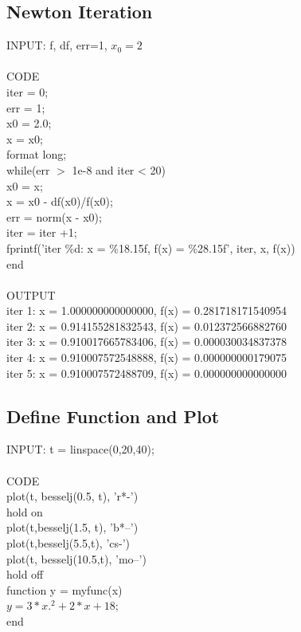 \documentclass[twoside,a4paper]{article}
\begin{document}
\subsection*{Newton Iteration}
\large INPUT: f, df, err=1, $x_0=2$ \\
\\
\large CODE \\
iter = 0;\\
err = 1;\\
x0 = 2.0;\\
x = x0;\\
format long;\\
while(err $>$ 1e-8 and iter < 20)\\
x0 = x;\\
x = x0 - df(x0)/f(x0);\\
err = norm(x - x0);\\
iter = iter +1;\\
fprintf('iter \%d: x = \%18.15f, f(x) = \%28.15f', iter, x, f(x))\\
end\\
\\
\large OUTPUT \\
iter 1: x =  1.000000000000000, f(x) =            0.281718171540954 \\
iter 2: x =  0.914155281832543, f(x) =            0.012372566882760 \\
iter 3: x =  0.910017665783406, f(x) =            0.000030034837378\\ 
iter 4: x =  0.910007572548888, f(x) =            0.000000000179075\\ 
iter 5: x =  0.910007572488709, f(x) =            0.000000000000000 \\

\subsection*{Define Function and Plot}
\large INPUT: t = linspace(0,20,40); \\
\\
\large CODE \\
plot(t, besselj(0.5, t), 'r*-')\\
hold on\\
plot(t,besselj(1.5, t), 'b*--')\\
plot(t,besselj(5.5,t), 'cs-')\\
plot(t, besselj(10.5,t), 'mo--')\\
hold off\\
function y = myfunc(x)\\
$y = 3*x.^2 + 2*x + 18;$\\
end\\
\end{document}
